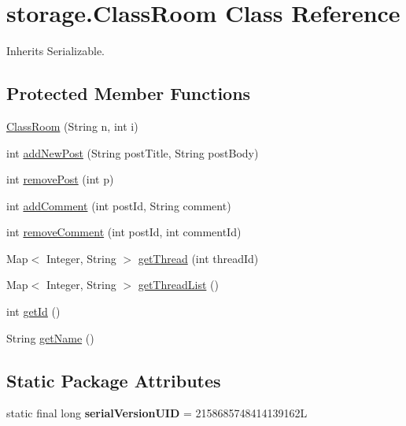 \hypertarget{classstorage_1_1_class_room}{
\section{storage.\-Class\-Room \-Class \-Reference}
\label{classstorage_1_1_class_room}
}


\-Inherits \-Serializable.

\subsection*{\-Protected \-Member \-Functions}
\begin{DoxyCompactItemize}
\item 
\hyperlink{classstorage_1_1_class_room_a599d3658872f638a0e35429dc8695814}{\-Class\-Room} (\-String n, int i)
\item 
int \hyperlink{classstorage_1_1_class_room_ac9d8525146e0d289ee6f5c2dcbb3d1d1}{add\-New\-Post} (\-String post\-Title, \-String post\-Body)
\item 
int \hyperlink{classstorage_1_1_class_room_ae7005fd8146a347c4a32540026d921bd}{remove\-Post} (int p)
\item 
int \hyperlink{classstorage_1_1_class_room_aaa3bc49b0c9bc6919409c6566cce2e07}{add\-Comment} (int post\-Id, \-String comment)
\item 
int \hyperlink{classstorage_1_1_class_room_a4cd6824f0528a55f136f780beade6e3e}{remove\-Comment} (int post\-Id, int comment\-Id)
\item 
\-Map$<$ \-Integer, \-String $>$ \hyperlink{classstorage_1_1_class_room_acaeeb104e3f5e72b7f3fb91f9c9ee90a}{get\-Thread} (int thread\-Id)
\item 
\-Map$<$ \-Integer, \-String $>$ \hyperlink{classstorage_1_1_class_room_af1a0af72dd37f80e5699750354f9e95b}{get\-Thread\-List} ()
\item 
int \hyperlink{classstorage_1_1_class_room_a43896a347f4b74eaf414e269d0b801cb}{get\-Id} ()
\item 
\-String \hyperlink{classstorage_1_1_class_room_ab590bc6bc8007c84759321f34857ea40}{get\-Name} ()
\end{DoxyCompactItemize}
\subsection*{\-Static \-Package \-Attributes}
\begin{DoxyCompactItemize}
\item 
\hypertarget{classstorage_1_1_class_room_ae2943fe0f2eac7388b0b83b6b3a9245a}{
static final long {\bfseries serial\-Version\-U\-I\-D} = 2158685748414139162\-L}
\label{classstorage_1_1_class_room_ae2943fe0f2eac7388b0b83b6b3a9245a}

\end{DoxyCompactItemize}


